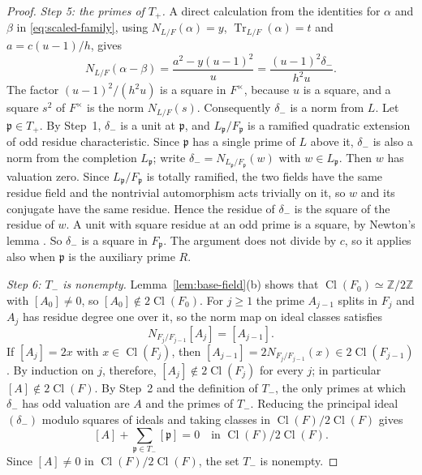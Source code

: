 \documentclass[11pt]{article}
\theoremstyle{plain}
\theoremstyle{definition}
\theoremstyle{remark}
\DeclareMathOperator{\Cl}{Cl}
\newcommand{\Z}{\mathbb Z}
\begin{document}
\begin{proof}
\emph{Step 5: the primes of $T_+$.}  A direct calculation from the
identities for $\alpha$ and $\beta$ in \eqref{eq:scaled-family}, using
$N_{L/F}(\alpha)=y$, $\operatorname{Tr}_{L/F}(\alpha)=t$ and
$a=c(u-1)/h$, gives
\begin{equation}\label{eq:comparison-norm}
 N_{L/F}(\alpha-\beta)
   =\frac{a^2-y(u-1)^2}{u}
   =\frac{(u-1)^2\delta_-}{h^2u}.
\end{equation}
The factor $(u-1)^2/(h^2u)$ is a square in $F^\times$, because $u$ is a
square, and a square $s^2$ of $F^\times$ is the norm $N_{L/F}(s)$.
Consequently $\delta_-$ is a norm from $L$.  Let $\mathfrak p\in T_+$.  By
Step~1, $\delta_-$ is a unit at $\mathfrak p$, and $L_{\mathfrak
p}/F_{\mathfrak p}$ is a ramified quadratic extension of odd residue
characteristic.  Since $\mathfrak p$ has a single prime of $L$ above it,
$\delta_-$ is also a norm from the completion $L_{\mathfrak p}$; write
$\delta_-=N_{L_{\mathfrak p}/F_{\mathfrak p}}(w)$ with $w\in L_{\mathfrak p}$.  Then $w$ has valuation zero.  Since
$L_{\mathfrak p}/F_{\mathfrak p}$ is totally ramified, the two fields have
the same residue field and the nontrivial automorphism acts trivially on
it, so $w$ and its conjugate have the same residue.  Hence the residue of
$\delta_-$ is the square of the residue of $w$.  A unit with square residue
at an odd prime is a square, by Newton's lemma \cite[Theorem~7.32]{MilneANT}.
So $\delta_-$ is a square in $F_{\mathfrak p}$.  The argument does not
divide by $c$, so it applies also when $\mathfrak p$ is the auxiliary
prime $R$.

\emph{Step 6: $T_-$ is nonempty.}  Lemma~\ref{lem:base-field}(b) shows
that $\Cl(F_0)\simeq\Z/2\Z$ with $[A_0]\ne0$, so $[A_0]\notin2\Cl(F_0)$.
For $j\ge1$ the prime $A_{j-1}$ splits in $F_j$ and $A_j$ has residue
degree one over it, so the norm map on ideal classes satisfies
\[
 N_{F_j/F_{j-1}}[A_j]=[A_{j-1}].
\]
If $[A_j]=2x$ with $x\in\Cl(F_j)$, then
$[A_{j-1}]=2N_{F_j/F_{j-1}}(x)\in2\Cl(F_{j-1})$.  By induction on $j$,
therefore, $[A_j]\notin2\Cl(F_j)$ for every $j$; in particular
$[A]\notin2\Cl(F)$.  By Step~2 and the definition of $T_-$, the only
primes at which $\delta_-$ has odd valuation are $A$ and the primes of
$T_-$.  Reducing the principal ideal $(\delta_-)$ modulo squares of ideals
and taking classes in $\Cl(F)/2\Cl(F)$ gives
\begin{equation}\label{eq:minus-class-relation}
 [A]+\sum_{\mathfrak p\in T_-}[\mathfrak p]=0
       \quad\text{in }\Cl(F)/2\Cl(F).
\end{equation}
Since $[A]\ne0$ in $\Cl(F)/2\Cl(F)$, the set $T_-$ is nonempty.
\end{proof}
\end{document}
